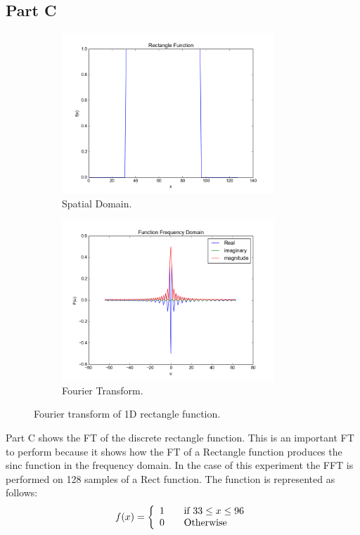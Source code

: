 \documentclass[letter]{article}
\begin{document}
\subsection{Part C}
\begin{figure}[hbtp]
  \centering
  \begin{subfigure}{8cm}
    \includegraphics[width=8cm]{images/function_rect.png}
    \caption{Spatial Domain.}
  \end{subfigure}
  \begin{subfigure}{8cm}
    \includegraphics[width=8cm]{images/function_rect_plot.png}
    \caption{Fourier Transform.}
  \end{subfigure}
  \caption{Fourier transform of 1D rectangle function.}
  \label{fig:ft_rect}
\end{figure}
Part C shows the FT of the discrete rectangle function. This is an important FT to perform because it shows how the FT of a Rectangle function produces the sinc function in the frequency domain. In the case of this experiment the FFT is performed on 128 samples of a Rect function. The function is represented as follows: $$f(x) = \left \{ \begin{array}{l l} 1 & \quad \text{if $33 \leq x \leq 96$}\\ 0 & \quad \text{Otherwise}\end{array} \right.$$
\end{document}
